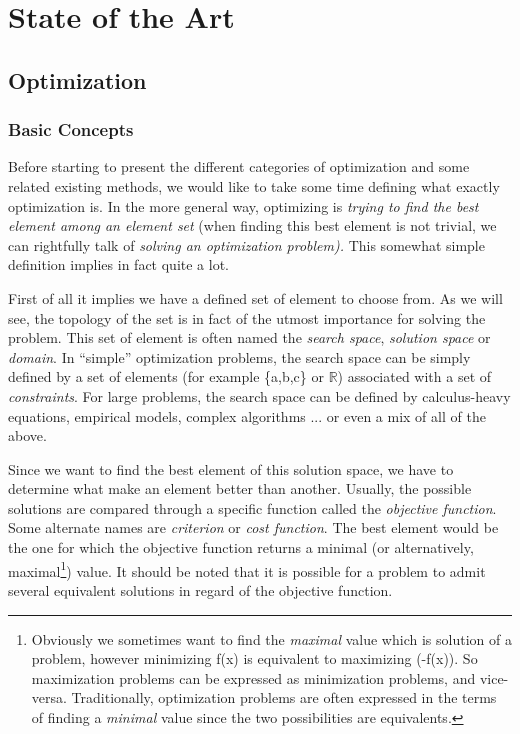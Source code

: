 
\chapter{State of the Art}

\section{Optimization}

\subsection{Basic Concepts}

Before starting to present the different categories of optimization and some related existing methods, we would like to take some time defining what exactly optimization is. In the more general way, optimizing is \emph{trying to find the best element among an element set} (when finding this best element is not trivial, we can rightfully talk of \emph{solving an optimization problem). }This somewhat simple definition implies in fact quite a lot.

First of all it implies we have a defined set of element to choose from. As we will see, the topology of the set is in fact of the utmost importance for solving the problem. This set of element is often named the \emph{search space}, \emph{solution space} or \emph{domain}. In {}``simple'' optimization problems, the search space can be simply defined by a set of elements (for example \{a,b,c\} or \ensuremath{\mathbb{R}}) associated with a set of \emph{constraints}. For large problems, the search space can be defined by calculus-heavy equations, empirical models, complex algorithms ... or even a mix of all of the above.

Since we want to find the best element of this solution space, we have to determine what make an element better than another. Usually, the possible solutions are compared through a specific function called the \emph{objective function}. Some alternate names are \emph{criterion} or \emph{cost function}. The best element would be the one for which the objective function returns a minimal (or alternatively, maximal\footnote{Obviously we sometimes want to find the \emph{maximal} value which is solution of a problem, however minimizing f(x) is equivalent to maximizing (-f(x)). So maximization problems can be expressed as minimization problems, and vice-versa. Traditionally, optimization problems are often expressed in the terms of finding a \emph{minimal} value since the two possibilities are equivalents.}) value. It should be noted that it is possible for a problem to admit several equivalent solutions in regard of the objective function.

